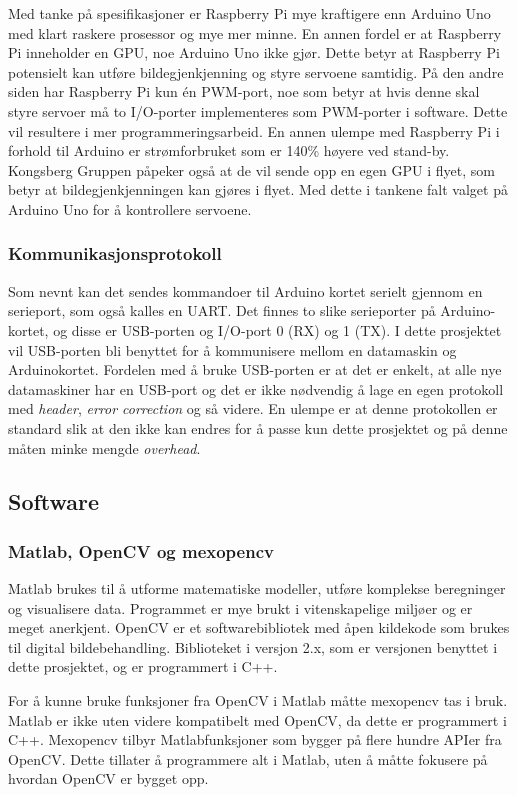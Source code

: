 Med tanke på spesifikasjoner er Raspberry Pi mye kraftigere enn Arduino Uno med klart raskere prosessor og mye mer minne. En annen fordel er at Raspberry Pi inneholder en GPU, noe Arduino Uno ikke gjør. Dette betyr at Raspberry Pi potensielt kan utføre bildegjenkjenning og styre servoene samtidig. På den andre siden har Raspberry Pi kun én PWM-port, noe som betyr at hvis denne skal styre servoer må to I/O-porter implementeres som PWM-porter i software. Dette vil resultere i mer programmeringsarbeid. En annen ulempe med Raspberry Pi i forhold til Arduino er strømforbruket som er 140\% høyere ved stand-by.\cite{ArduinoSpec,RpiSpec} Kongsberg Gruppen påpeker også at de vil sende opp en egen GPU i flyet, som betyr at bildegjenkjenningen kan gjøres i flyet. Med dette i tankene falt valget på Arduino Uno for å kontrollere servoene.

\subsubsection{Kommunikasjonsprotokoll}

Som nevnt kan det sendes kommandoer til Arduino kortet serielt gjennom en serieport, som også kalles en UART. Det finnes to slike serieporter på Arduino-kortet, og disse er USB-porten og I/O-port 0 (RX) og 1 (TX). I dette prosjektet vil USB-porten bli benyttet for å kommunisere mellom en datamaskin og Arduinokortet. Fordelen med å bruke USB-porten er at det er enkelt, at alle nye datamaskiner har en USB-port og det er ikke nødvendig å lage en egen protokoll med \emph{header}, \emph{error correction} og så videre. En ulempe er at denne protokollen er standard slik at den ikke kan endres for å passe kun dette prosjektet og på denne måten minke mengde \emph{overhead}.

\subsection{Software}

\subsubsection{Matlab, OpenCV og mexopencv}
Matlab brukes til å utforme matematiske modeller, utføre komplekse beregninger og visualisere data. \cite{matlab} Programmet er mye brukt i vitenskapelige miljøer og er meget anerkjent. 
OpenCV er et softwarebibliotek med åpen kildekode som brukes til digital bildebehandling. Biblioteket i versjon 2.x, som er versjonen benyttet i dette prosjektet, og er programmert i C++. \cite{docs:opencv}

For å kunne bruke funksjoner fra OpenCV i Matlab måtte mexopencv tas i bruk. Matlab er ikke uten videre kompatibelt med OpenCV, da dette er programmert i C++. Mexopencv tilbyr Matlabfunksjoner som bygger på flere hundre APIer fra OpenCV. \cite{mexopencv} Dette tillater å programmere alt i Matlab, uten å måtte fokusere på hvordan OpenCV er bygget opp. 
